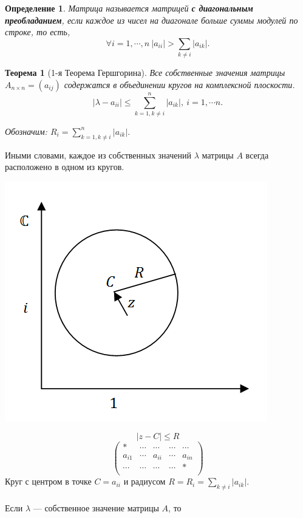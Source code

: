 \documentclass[12pt]{article}
\newtheorem*{definition}{Определение}
\newtheorem*{theorem}{Теорема}
\begin{document}
	\begin{definition}
		Матрица называется матрицей \textbf{с диагональным преобладанием}, если каждое из чисел на диагонале больше суммы модулей по строке, то есть, $$\forall i=1,\cdots,n~|a_{ii}|>\sum\limits_{k\neq i}|a_{ik}|.$$
	\end{definition} 
	\begin{theorem}[1-я Теорема Гершгорина]
		Все собственные значения матрицы $A_{n \times n}=(a_{ij})$ содержатся в объединении кругов на комплексной плоскости. $$|\lambda-a_{ii}|\leqslant \sum\limits_{k=1, k\neq i}^n|a_{ik}|,~i=1,\cdots n.$$
		
		Обозначим: $R_i=\sum\limits_{k=1, k\neq i}^n|a_{ik}|.$
	\end{theorem} 
	Иными словами, каждое из собственных значений $\lambda$ матрицы $A$ всегда расположено в одном из кругов.
	\begin{center}
		\includegraphics[scale=0.8]{l9_2.png}
	\end{center}
	$$|z-C|\leqslant R$$
	\[\begin{pmatrix}
	* & \cdots & \cdots & \cdots & \cdots\\
	a_{i1} & \cdots & a_{ii} & \cdots & a_{in}\\
	\cdots & \cdots & \cdots & \cdots & *\\
	\end{pmatrix}\]
	Круг с центром в точке $C=a_{ii}$ и радиусом $R=R_i=\sum\limits_{k\neq i}|a_{ik}|.$\\
	\\
	Если $\lambda$ --- собственное значение матрицы $A$, то
\end{document}
